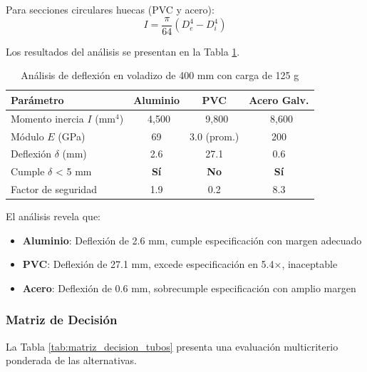 Para secciones circulares huecas (PVC y acero):
\begin{equation}
I = \frac{\pi}{64}(D_e^{4} - D_i^{4})
\end{equation}

Los resultados del análisis se presentan en la Tabla \ref{tab:deflexion_tubos}.

\begin{table}[H]
\centering
\caption{Análisis de deflexión en voladizo de 400 mm con carga de 125 g}
\label{tab:deflexion_tubos}
\small
\begin{tabular}{|l|c|c|c|}
\hline
\textbf{Parámetro} & \textbf{Aluminio} & \textbf{PVC} & \textbf{Acero Galv.} \\
\hline
Momento inercia $I$ (mm$^4$) & ~4,500 & ~9,800 & ~8,600 \\
Módulo $E$ (GPa) & 69 & 3.0 (prom.) & 200 \\
Deflexión $\delta$ (mm) & 2.6 & 27.1 & 0.6 \\
Cumple $\delta$ < 5 mm & \textbf{Sí} & \textbf{No} & \textbf{Sí} \\
Factor de seguridad & 1.9 & 0.2 & 8.3 \\
\hline
\end{tabular}
\end{table}

El análisis revela que:
\begin{itemize}
    \item \textbf{Aluminio}: Deflexión de 2.6 mm, cumple especificación con margen adecuado
    \item \textbf{PVC}: Deflexión de 27.1 mm, excede especificación en 5.4×, inaceptable
    \item \textbf{Acero}: Deflexión de 0.6 mm, sobrecumple especificación con amplio margen
\end{itemize}

\subsubsection{Matriz de Decisión}

La Tabla \ref{tab:matriz_decision_tubos} presenta una evaluación multicriterio ponderada de las alternativas.

